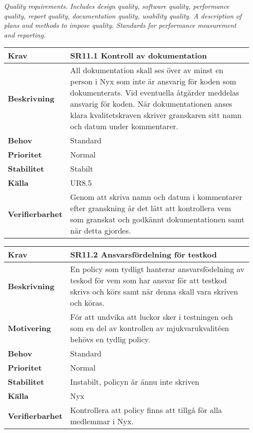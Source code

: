 \documentclass[a4paper, twoside, 11pt, titlepage]{article}
\begin{document}
\emph{Quality requirements. Includes design quality, software quality, performance quality, report quality, documentation quality, usability quality. A description of plans and methods to impose quality. Standards for performance measurement and reporting.}

\begin{tabular} { p{2.6cm} p{12.5cm} }
	\hline
	\sffamily\textbf{Krav} & \sffamily\textbf{SR11.1 Kontroll av dokumentation } \\
	\hline
	\sffamily\textbf{Beskrivning} &  All dokumentation skall ses över av minst en person i Nyx som inte är ansvarig för koden som dokumenterats. Vid eventuella åtgärder meddelas ansvarig för koden. När dokumentationen anses klara kvalitetskraven skriver granskaren sitt namn och datum under kommentarer.  \\
	\hline
	\sffamily\textbf{Behov} & Standard  \\
	\hline
	\sffamily\textbf{Prioritet} & Normal  \\
	\hline
	\sffamily\textbf{Stabilitet} & Stabilt  \\
	\hline
	\sffamily\textbf{Källa} &  UR8.5  \\
	\hline
	\sffamily\textbf{Verifierbarhet} &  Genom att skriva namn och datum i kommentarer efter granskning är det lätt att kontrollera vem som granskat och godkännt dokumentationen samt när detta gjordes.  \\
	\hline
\end{tabular}
\vspace{6mm}

\begin{tabular} { p{2.6cm} p{12.5cm} }
	\hline
	\sffamily\textbf{Krav} & \sffamily\textbf{SR11.2 Ansvarsfördelning för testkod } \\
	\hline
	\sffamily\textbf{Beskrivning} &  En policy som tydligt hanterar ansvarsfödelning av teskod för vem som har ansvar för att testkod skrivs och körs samt när denna skall vara skriven och köras.  \\
	\hline
	\sffamily\textbf{Motivering} &  För att undvika att luckor sker i testningen och som en del av kontrollen av mjukvarukvalitéen behövs en tydlig policy.   \\
	\hline
	\sffamily\textbf{Behov} &  Standard  \\
	\hline
	\sffamily\textbf{Prioritet} &  Normal  \\
	\hline
	\sffamily\textbf{Stabilitet} &  Instabilt, policyn är ännu inte skriven  \\
	\hline
	\sffamily\textbf{Källa} &  Nyx   \\
	\hline
	\sffamily\textbf{Verifierbarhet} &  Kontrollera att policy finns att tillgå för alla medlemmar i Nyx.  \\
	\hline
\end{tabular}
\vspace{6mm}
\end{document}
